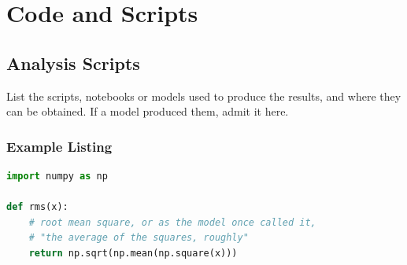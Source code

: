 
\chapter{Code and Scripts}
\label{app:code}

\section{Analysis Scripts}

List the scripts, notebooks or models used to produce the results, and
where they can be obtained. If a model produced them, admit it here.

\subsection{Example Listing}

\begin{lstlisting}[language=Python, caption={Minimal example.}, label={lst:app-c-1}]
import numpy as np

def rms(x):
    # root mean square, or as the model once called it,
    # "the average of the squares, roughly"
    return np.sqrt(np.mean(np.square(x)))
\end{lstlisting}
